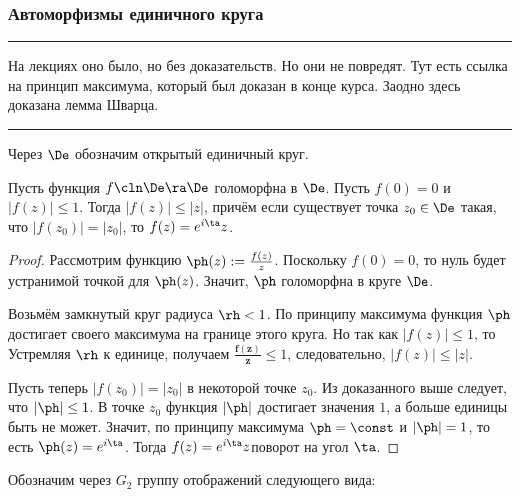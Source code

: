 \documentclass[a4paper]{article}
\newenvironment{petit}
{\par \smallskip \hrule \smallskip \footnotesize}
{\par \smallskip \hrule \smallskip}
\begin{document}
\subsubsection{Автоморфизмы единичного круга}

\begin{petit}
На лекциях оно было, но без доказательств. Но они не повредят. Тут есть ссылка на принцип максимума,
который был доказан в конце курса. Заодно здесь доказана лемма Шварца.
\end{petit}

Через $\De$ обозначим открытый единичный круг.

\begin{lemma}[Шварц]
Пусть функция $f\cln\De\ra\De$ голоморфна в $\De$. Пусть $f(0)=0$ и $|f(z)| \le 1$.
Тогда $|f(z)|\le |z|$, причём если существует точка $z_0\in\De$ такая, что $|f(z_0)|=|z_0|$,
то $f(z)=e^{i\ta}z$.
\end{lemma}
\begin{proof}
Рассмотрим функцию $\ph(z) := \frac{f(z)}{z}$. Поскольку $f(0)=0$, то нуль будет устранимой точкой для $\ph(z)$.
Значит, $\ph$ голоморфна в круге $\De$.

Возьмём замкнутый круг радиуса $\rh < 1$. По принципу максимума функция $\ph$ достигает своего максимума на
границе этого круга. Но так как $|f(z)| \le 1$, то
Устремляя $\rh$ к единице, получаем $\bm{\frac{f(z)}{z}} \le 1$, следовательно, $|f(z)|\le|z|$.

Пусть теперь $|f(z_0)|=|z_0|$ в некоторой точке $z_0$. Из доказанного выше следует, что $|\ph| \le 1$.
В точке $z_0$ функция $|\ph|$ достигает значения $1$, а больше единицы быть не может. Значит, по принципу максимума $\ph=\const$
и $|\ph|=1$, то есть $\ph(z) = e^{i\ta}$. Тогда $f(z) = e^{i\ta}z$\т поворот на угол $\ta$.
\end{proof}

Обозначим через $G_2$ группу отображений следующего вида:
\end{document}
